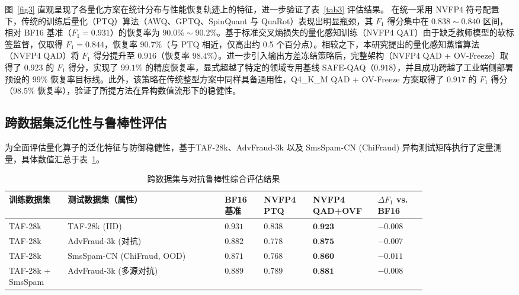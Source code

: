 \documentclass[11pt, a4paper]{article}
\begin{document}
图~\ref{fig3} 直观呈现了各量化方案在统计分布与性能恢复轨迹上的特征，进一步验证了表~\ref{tab3} 评估结果。
 在统一采用 NVFP4 符号配置下，传统的训练后量化（PTQ）算法（AWQ、GPTQ、SpinQuant 与 QuaRot）表现出明显瓶颈，其 $F_1$ 得分集中在 $0.838 \sim 0.840$ 区间，相对 BF16 基准（$F_1=0.931$）的恢复率为 $90.0\% \sim 90.2\%$。基于标准交叉熵损失的量化感知训练（NVFP4 QAT）由于缺乏教师模型的软标签监督，仅取得 $F_1=0.844$，恢复率 $90.7\%$（与 PTQ 相近，仅高出约 0.5 个百分点）。相较之下，本研究提出的量化感知蒸馏算法（NVFP4 QAD）将 $F_1$ 得分提升至 $0.916$（恢复率 $98.4\%$）。进一步引入输出方差冻结策略后，完整架构（NVFP4 QAD + OV-Freeze）取得了 $0.923$ 的 $F_1$ 得分，实现了 $99.1\%$ 的精度恢复率，显式超越了特定的领域专用基线 SAFE-QAQ（$0.918$），并且成功跨越了工业端侧部署预设的 $99\%$ 恢复率目标线。此外，该策略在传统整型方案中同样具备通用性，Q4\_K\_M QAD + OV-Freeze 方案取得了 $0.917$ 的 $F_1$ 得分（$98.5\%$ 恢复率），验证了所提方法在异构数值流形下的稳健性。

\subsection{跨数据集泛化性与鲁棒性评估}

为全面评估量化算子的泛化特征与防御稳健性，基于TAF-28k、AdvFraud-3k 以及 SmsSpam-CN (ChiFraud) 异构测试矩阵执行了定量测量，具体数值汇总于表~\ref{tab4}。
\begin{table}[htbp]
\centering
\caption{跨数据集与对抗鲁棒性综合评估结果}
\label{tab4}
\small
\renewcommand{\arraystretch}{1.15}
\begin{tabular}{>{\raggedright\arraybackslash}p{0.12\linewidth}>{\raggedright\arraybackslash}p{0.32\linewidth}>{\centering\arraybackslash}p{0.08\linewidth}>{\centering\arraybackslash}p{0.1\linewidth}>{\centering\arraybackslash}p{0.1\linewidth}>{\centering\arraybackslash}p{0.1\linewidth}}
\toprule
\textbf{训练数据集} & \textbf{测试数据集（属性）} & \textbf{BF16 基准} & \textbf{NVFP4 PTQ} & \textbf{NVFP4 QAD+OVF} & \textbf{$\Delta F_1$ vs. BF16} \\
\midrule
TAF-28k & TAF-28k (IID) & $0.931$ & $0.838$ & $\textbf{0.923}$ & $-0.008$ \\
TAF-28k & AdvFraud-3k (对抗) & $0.882$ & $0.778$ & $\textbf{0.875}$ & $-0.007$ \\
TAF-28k & SmsSpam-CN (ChiFraud, OOD) & $0.871$ & $0.768$ & $\textbf{0.860}$ & $-0.011$ \\
TAF-28k + SmsSpam & AdvFraud-3k (多源对抗) & $0.889$ & $0.789$ & $\textbf{0.881}$ & $-0.008$ \\
\bottomrule
\end{tabular}
\end{table}
\end{document}
